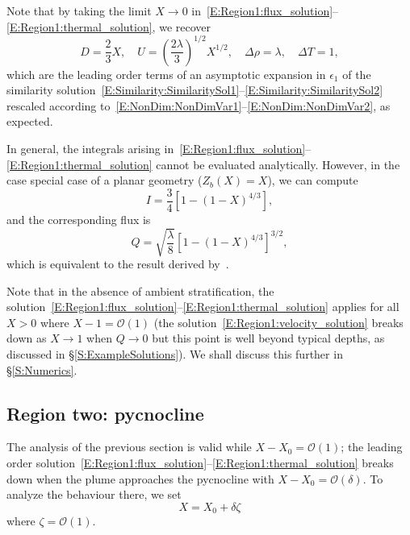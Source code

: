 \documentclass[openacc]{rsproca_new}%
\newcommand{\order}[1]{\mathcal{O}(#1)}
\newcommand{\epsone}{\epsilon_{1}} %
\newcommand{\lt}{\delta} %
\begin{document}
Note that by taking the limit $X \to 0$ in~\eqref{E:Region1:flux_solution}--\eqref{E:Region1:thermal_solution}, we recover 
\begin{equation}\label{E:Region1:dimensionless_similarity}
D = \frac{2}{3}X, \quad U = \left(\frac{2\lambda}{3}\right)^{1/2}X^{1/2}, \quad \Delta \rho = \lambda, \quad \Delta T = 1,
\end{equation} 
which are the leading order terms of an asymptotic expansion in $\epsone$ of the similarity solution~\eqref{E:Similarity:SimilaritySol1}--\eqref{E:Similarity:SimilaritySol2} rescaled according to~\eqref{E:NonDim:NonDimVar1}--\eqref{E:NonDim:NonDimVar2}, as expected.

In general, the integrals arising in~\eqref{E:Region1:flux_solution}--\eqref{E:Region1:thermal_solution} cannot be evaluated analytically. However, in the case special case of a planar geometry ($Z_b(X) = X$), we can compute
\begin{equation}
    I = \frac{3}{4}\left[1 - (1 - X)^{4/3}\right],
\end{equation}
and the corresponding flux is
\begin{equation}\label{E:Region1:Lazeroms_flux}
Q =  \sqrt{\frac{\lambda}{8}}\left[1 - (1-X)^{4/3}\right]^{3/2},
\end{equation}
which is equivalent to the result derived by~\cite{Lazeroms2019JPhysOcean}.

Note that in the absence of ambient stratification, the solution~\eqref{E:Region1:flux_solution}--\eqref{E:Region1:thermal_solution} applies for all $X> 0$ where $X - 1 = \mathcal{O}(1)$ (the solution~\eqref{E:Region1:velocity_solution} breaks down as $X \to 1$ when $Q \to 0$ but this point is well beyond typical depths, as discussed in \S\ref{S:ExampleSolutions}). We shall discuss this further in \S\ref{S:Numerics}.

\subsection{Region two: pycnocline}\label{S:Asymptotics:Region2}
The analysis of the previous section is valid while $X - X_0 = \mathcal{O}(1)$; the leading order solution~\eqref{E:Region1:flux_solution}--\eqref{E:Region1:thermal_solution} breaks down when the plume approaches the pycnocline with $X - X_0 = \order{\delta}$. To analyze the behaviour there, we set
\begin{equation}\label{E:pycnocline:length_scaling}
X = X_0 + \lt \zeta
\end{equation}
where $\zeta = \mathcal{O}(1)$. 
\end{document}
